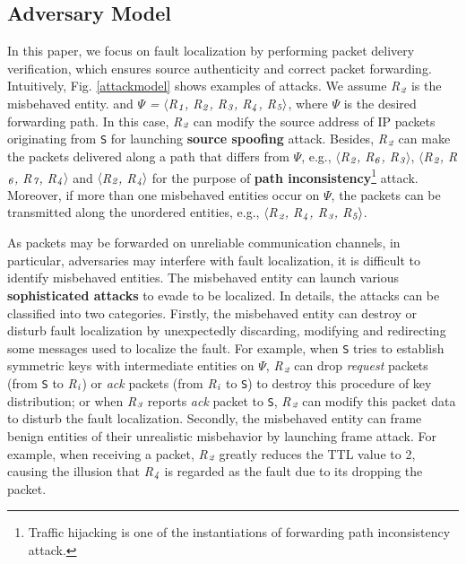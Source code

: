 \subsection{Adversary Model}
In this paper, we focus on fault localization by performing packet delivery verification, which ensures source authenticity and correct packet forwarding. Intuitively, Fig. \ref{attackmodel} shows  examples of attacks. We assume \emph{R}$_\emph{2}$ is the misbehaved entity. and $\Psi$ \emph{=} $\langle$\emph{R}$_\emph{1}$\emph{, R}$_\emph{2}$\emph{, R}$_\emph{3}$\emph{, R}$_\emph{4}$\emph{, R}$_\emph{5}\rangle$, where $\Psi$ is the desired forwarding path. In this case, \emph{R}$_\emph{2}$ can modify the source address of IP packets originating from {\tt S} for launching \textbf{source spoofing} attack. Besides, \emph{R}$_\emph{2}$ can make the packets delivered along a path that differs from $\Psi$, e.g., $\langle$\emph{R}$_\emph{2}$\emph{, R}$_\emph{6}$\emph{, R}$_\emph{3}$$\rangle$, $\langle$\emph{R}$_\emph{2}$\emph{, R}$_\emph{6}$\emph{, R}$_\emph{7}$\emph{, R}$_\emph{4}$$\rangle$ and $\langle$\emph{R}$_\emph{2}$\emph{, R}$_\emph{4}\rangle$ for the purpose of \textbf{path inconsistency}\footnote{Traffic hijacking is one of the instantiations of forwarding path inconsistency attack.} attack. Moreover, if more than one misbehaved entities occur on $\Psi$, the packets can be transmitted along the unordered entities, e.g., $\langle$\emph{R}$_\emph{2}$\emph{, R}$_\emph{4}$\emph{, R}$_\emph{3}$\emph{, R}$_\emph{5}\rangle$.

As packets may be forwarded on unreliable communication channels, in particular, adversaries may interfere with fault localization, it is difficult to identify misbehaved entities. %
The misbehaved entity can launch various \textbf{sophisticated attacks} to evade to be localized. In details, the attacks can be classified into two categories.
Firstly, the misbehaved entity can destroy or disturb fault localization by unexpectedly discarding, modifying and redirecting some messages used to localize the fault. For example, when {\tt S} tries to establish symmetric keys with intermediate entities on $\Psi$, \emph{R}$_\emph{2}$ can drop \emph{request} packets (from {\tt S} to \emph{R}$_\emph{i}$) or \emph{ack} packets (from \emph{R}$_\emph{i}$ to {\tt S}) to destroy this procedure of key distribution; or when \emph{R}$_\emph{3}$ reports \emph{ack} packet to {\tt S}, \emph{R}$_\emph{2}$ can modify this packet data to disturb the fault localization.
Secondly, the misbehaved entity can frame benign entities of their unrealistic misbehavior by launching frame attack. For example, when receiving a packet, \emph{R}$_\emph{2}$ greatly reduces the TTL value to 2, causing the illusion that \emph{R}$_\emph{4}$ is regarded as the fault due to its dropping the packet.
\vspace{-0.1in}
